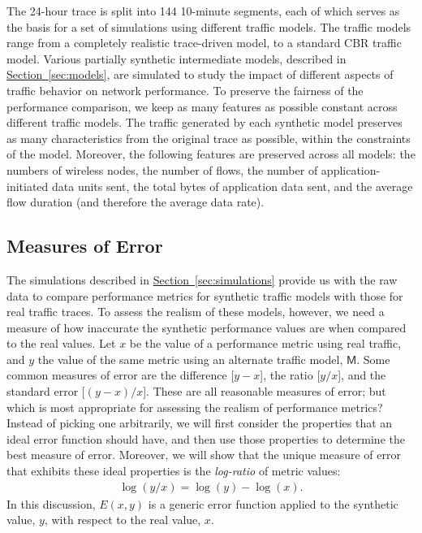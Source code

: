 \documentclass[conference]{IEEEtran}
\newcommand{\caps}[1]{{\small{#1}}}
\newcommand{\Section}[1]{\hyperref[sec:#1]{Section~\ref*{sec:#1}}}
\newcommand{\M}{\mathsf{M}}
\begin{document}
The 24-hour trace is split into 144 10-minute segments, each of which serves as the basis for a set of simulations using different traffic models. The traffic models range from a completely realistic trace-driven model, to a standard \caps{CBR} traffic model. Various partially synthetic intermediate models, described in \Section{models}, are simulated to study the impact of different aspects of traffic behavior on network performance. To preserve the fairness of the performance comparison, we keep as many features as possible constant across different traffic models. The traffic generated by each synthetic model preserves as many characteristics from the original trace as possible, within the constraints of the model. Moreover, the following features are preserved across all models: the numbers of wireless nodes, the number of flows, the number of application-initiated data units sent, the total bytes of application data sent, and the average flow duration (and therefore the average data rate).

\subsection{Measures of Error}\label{sec:error-measures}

The simulations described in \Section{simulations} provide us with the raw data to compare performance metrics for synthetic traffic models with those for real traffic traces. To assess the realism of these models, however, we need a measure of how inaccurate the synthetic performance values are when compared to the real values. Let $x$ be the value of a performance metric using real traffic, and $y$ the value of the same metric using an alternate traffic model, $\M$. Some common measures of error are the difference [$y-x$], the ratio [$y/x$], and the standard error [$(y-x)/x$]. These are all reasonable measures of error; but which is most appropriate for assessing the realism of performance metrics? Instead of picking one arbitrarily, we will first consider the properties that an ideal error function should have, and then use those properties to determine the best measure of error. Moreover, we will show that the unique measure of error that exhibits these ideal properties is the  \textit{log-ratio} of metric values:
\begin{align}
\log(y/x)=\log(y)-\log(x).
\end{align}
In this discussion, $E(x,y)$ is a generic error function applied to the synthetic value, $y$, with respect to the real value, $x$.
\end{document}
